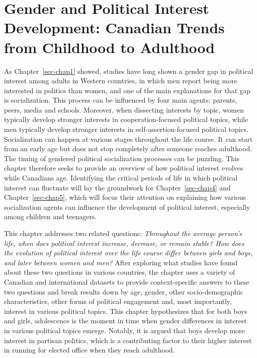\documentclass[
  letterpaper,
  DIV=11,
  numbers=noendperiod]{scrreprt}
\begin{document}

\chapter{Gender and Political Interest Development: Canadian Trends from
Childhood to Adulthood}\label{sec-chap3}

As Chapter~\ref{sec-chap1} showed, studies have long shown a gender gap
in political interest among adults in Western countries, in which men
report being more interested in politics than women, and one of the main
explanations for that gap is socialization. This process can be
influenced by four main agents: parents, peers, media and schools.
Moreover, when dissecting interests by topic, women typically develop
stronger interests in cooperation-focused political topics, while men
typically develop stronger interests in self-assertion-focused political
topics. Socialization can happen at various stages throughout the life
course. It can start from an early age but does not stop completely
after someone reaches adulthood. The timing of gendered political
socialization processes can be puzzling. This chapter therefore seeks to
provide an overview of how political interest evolves while Canadians
age. Identifying the critical periods of life in which political
interest can fluctuate will lay the groundwork for
Chapter~\ref{sec-chap4} and Chapter~\ref{sec-chap5}, which will focus
their attention on explaining how various socialization agents can
influence the development of political interest, especially among
children and teenagers.

This chapter addresses two related questions: \emph{Throughout the
average person's life, when does political interest increase, decrease,
or remain stable? How does the evolution of political interest over the
life course differ between girls and boys, and later between women and
men?} After exploring what studies have found about these two questions
in various countries, the chapter uses a variety of Canadian and
international datasets to provide context-specific answers to these two
questions and break results down by age, gender, other socio-demographic
characteristics, other forms of political engagement and, most
importantly, interest in various political topics. This chapter
hypothesizes that for both boys and girls, adolescence is the moment in
time when gender differences in interest in various political topics
emerge. Notably, it is argued that boys develop more interest in
partisan politics, which is a contributing factor to their higher
interest in running for elected office when they reach adulthood.
\end{document}
